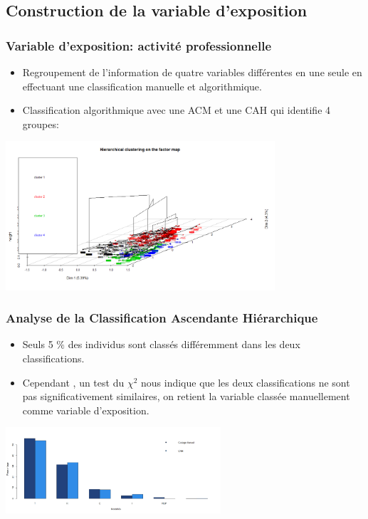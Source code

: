 \documentclass{beamer}
\begin{document}
\subsection{Construction de la variable d'exposition}
\begin{frame}
\frametitle{Variable d'exposition: activité professionnelle}
\begin{itemize}
\pause
\item Regroupement de l'information de quatre variables différentes en une seule en effectuant une classification manuelle et algorithmique.
\pause
\item Classification algorithmique avec une ACM et une CAH qui identifie 4 groupes:
\end{itemize}
\pause
\includegraphics[width = 10cm]{map_cah.png}
\end{frame}
\begin{frame}
\frametitle{Analyse de la Classification Ascendante Hiérarchique}
\begin{itemize}
\pause
\item
Seuls 5 $\%$ des individus sont classés différemment dans les deux classifications.
\pause
\item
Cependant , un test du $\chi^2$ nous indique que les deux classifications ne sont pas significativement similaires, on retient la variable classée manuellement comme variable d'exposition.
\end{itemize}
\begin{center}
\includegraphics[width = 8cm]{comp_codages_activpro_pourcentage.png}
\end{center}
\end{frame}
\end{document}
